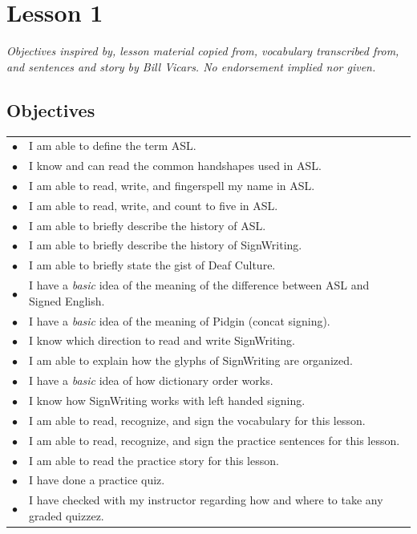 \documentclass{article}
\begin{document}
\newfontfamily{}
\newfontfamily{}
\newcommand{\bul}{\hfil$\bullet$&}
\renewenvironment{glossary}{\begin{multicols}{5}\begin{center}}{\end{center}\end{multicols}}
\setcounter{secnumdepth}{0}
\setlength{\columnseprule}{1pt}

\section{Lesson 1}

\begin{center}
\it
Objectives inspired by, lesson material copied from, vocabulary transcribed from, and sentences and story by Bill Vicars.
No endorsement implied nor given.
\end{center}

\subsection{Objectives}

\begin{tabular}{p{1cm}p{14cm}}
\bul I am able to define the term ASL.\\
\bul I know and can read the common handshapes used in ASL.\\
\bul I am able to read, write, and fingerspell my name in ASL.\\
\bul I am able to read, write, and count to five in ASL.\\
\bul I am able to briefly describe the history of ASL.\\
\bul I am able to briefly describe the history of SignWriting.\\
\bul I am able to briefly state the gist of Deaf Culture.\\
\bul I have a \emph{basic} idea of the meaning of the difference between ASL and Signed English.\\
\bul I have a \emph{basic} idea of the meaning of Pidgin (concat signing).\\
\bul I know which direction to read and write SignWriting.\\
\bul I am able to explain how the glyphs of SignWriting are organized.\\
\bul I have a \emph{basic} idea of how dictionary order works.\\
\bul I know how SignWriting works with left handed signing.\\
\bul I am able to read, recognize, and sign the vocabulary for this lesson.\\
\bul I am able to read, recognize, and sign the practice sentences for this lesson.\\
\bul I am able to read the practice story for this lesson.\\
\bul I have done a practice quiz.\\
\bul I have checked with my instructor regarding how and where to take any graded quizzez.\\
\end{tabular}
\end{document}
